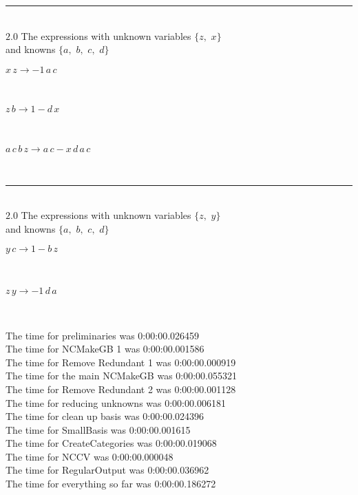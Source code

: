 \documentclass[rep10,leqno]{report}
\begin{document}
\rule[3pt]{6in}{.7pt}\\
$2.0$  The expressions with unknown variables $\{z,
$ $
x\}$\\
and knowns $\{a,
$ $
b,
$ $
c,
$ $
d\}$\smallskip\\
\begin{minipage}{6in}
$
x\,
 z\rightarrow -1\,
 a\,
 c
$
\end{minipage}\medskip \\
\begin{minipage}{6in}
$
z\,
 b\rightarrow 1 - d\,
 x
$
\end{minipage}\medskip \\
\begin{minipage}{6in}
$
a\,
 c\,
 b\,
 z\rightarrow a\,
 c - x\,
 d\,
 a\,
 c
$
\end{minipage}\\
\rule[3pt]{6in}{.7pt}\\
$2.0$  The expressions with unknown variables $\{z,
$ $
y\}$\\
and knowns $\{a,
$ $
b,
$ $
c,
$ $
d\}$\smallskip\\
\begin{minipage}{6in}
$
y\,
 c\rightarrow 1 - b\,
 z
$
\end{minipage}\medskip \\
\begin{minipage}{6in}
$
z\,
 y\rightarrow -1\,
 d\,
 a
$
\end{minipage}\\
\vspace{10pt}

\noindent
The time for preliminaries was 0:00:00.026459\\
The time for NCMakeGB 1 was 0:00:00.001586\\
The time for Remove Redundant 1 was 0:00:00.000919\\
The time for the main NCMakeGB was 0:00:00.055321\\
The time for Remove Redundant 2 was 0:00:00.001128\\
The time for reducing unknowns was 0:00:00.006181\\
The time for clean up basis was 0:00:00.024396\\
The time for SmallBasis was 0:00:00.001615\\
The time for CreateCategories was 0:00:00.019068\\
The time for NCCV was 0:00:00.000048\\
The time for RegularOutput was 0:00:00.036962\\
The time for everything so far was 0:00:00.186272\\
\end{document}
